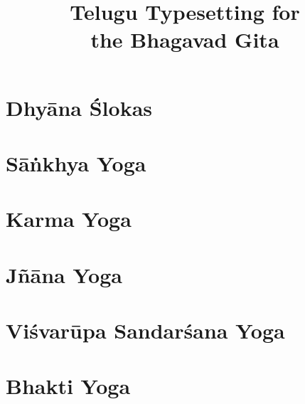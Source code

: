 \documentclass{scrbook}
\title{Telugu Typesetting for \\ the Bhagavad Gita}
\author{}
\begin{document}
\maketitle
\frontmatter

\tableofcontents
\newpage

\chapter{Dhyāna Ślokas}


\mainmatter
\setcounter{chapter}{1}

\chapter{Sāṅkhya Yoga}
\begin{multicols}{2}
    
\end{multicols}

\chapter{Karma Yoga}
\begin{multicols}{2}
    
\end{multicols}

\chapter{Jñāna Yoga}
\begin{multicols}{2}
    
\end{multicols}

\setcounter{chapter}{10}

\chapter{Viśvarūpa Sandarśana Yoga}
\begin{multicols}{2}
    
\end{multicols}

\chapter{Bhakti Yoga}
\begin{multicols}{2}
    
\end{multicols}
\end{document}
